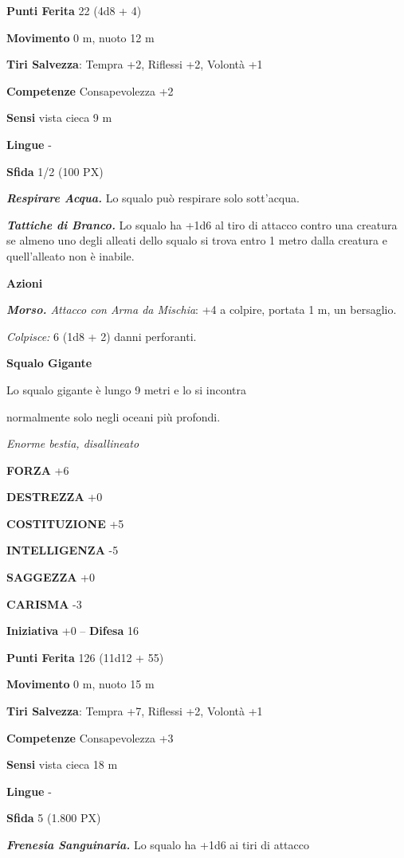 \begin{multicols}{2}
\textbf{Punti Ferita} 22 (4d8 + 4)

\textbf{Movimento} 0 m, nuoto 12 m

\textbf{Tiri Salvezza}: Tempra +2, Riflessi +2, Volontà +1

\textbf{Competenze} Consapevolezza +2

\textbf{Sensi} vista cieca 9 m

\textbf{Lingue} -

\textbf{Sfida} 1/2 (100 PX)

\textit{\textbf{Respirare Acqua.}} Lo squalo può respirare solo sott'acqua.

\textit{\textbf{Tattiche di Branco.}} Lo squalo ha +1d6 al tiro di attacco contro una creatura se almeno uno degli alleati dello squalo si trova entro 1 metro dalla creatura e quell'alleato non è inabile.

\textbf{Azioni}

\textit{\textbf{Morso.} Attacco con Arma da Mischia}: +4 a colpire, portata 1 m, un bersaglio.

\textit{Colpisce:} 6 (1d8 + 2) danni perforanti.

\medskip\textbf{Squalo Gigante}

Lo squalo gigante è lungo 9 metri e lo si incontra

normalmente solo negli oceani più profondi.

\textit{Enorme bestia, disallineato}

\textbf{FORZA} +6

\textbf{DESTREZZA} +0

\textbf{COSTITUZIONE} +5

\textbf{INTELLIGENZA} -5

\textbf{SAGGEZZA} +0

\textbf{CARISMA} -3

\textbf{Iniziativa} +0 -- \textbf{Difesa} 16

\textbf{Punti Ferita} 126 (11d12 + 55)

\textbf{Movimento} 0 m, nuoto 15 m

\textbf{Tiri Salvezza}: Tempra +7, Riflessi +2, Volontà +1

\textbf{Competenze} Consapevolezza +3

\textbf{Sensi} vista cieca 18 m

\textbf{Lingue} -

\textbf{Sfida} 5 (1.800 PX)

\textit{\textbf{Frenesia Sanguinaria.}} Lo squalo ha +1d6 ai tiri di attacco


\end{multicols}
